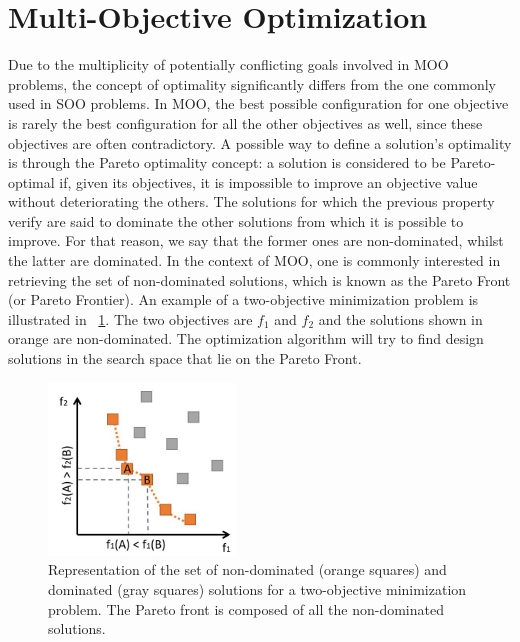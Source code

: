 \section{Multi-Objective Optimization}

Due to the multiplicity of potentially conflicting goals involved in \ac{MOO} problems, the concept of optimality significantly differs from the one commonly used in \ac{SOO} problems. In \ac{MOO}, the best possible configuration for one objective is rarely the best configuration for all the other objectives as well, since these objectives are often contradictory. A possible way to define a solution’s optimality is through the Pareto optimality concept: a solution is considered to be Pareto-optimal if, given its objectives, it is impossible to improve an objective value without deteriorating the others. The solutions for which the previous property verify are said to dominate the other solutions from which it is possible to improve. For that reason, we say that the former ones are non-dominated, whilst the latter are dominated. In the context of \ac{MOO}, one is commonly interested in retrieving the set of non-dominated solutions, which is known as the Pareto Front (or Pareto Frontier). An example of a two-objective minimization problem is illustrated in ~\cref{fig:paretofrontier}. The two objectives are $f_1$ and $f_2$ and the solutions shown in orange are non-dominated. The optimization algorithm will try to find design solutions in the search space that lie on the Pareto Front.


\begin{figure}
\centering
\includegraphics[width=5cm]{Images/Background/pareto-front.JPG}
\caption{Representation of the set of non-dominated (orange squares) and dominated (gray squares) solutions for a two-objective minimization problem. The Pareto front is composed of all the non-dominated solutions.}
\label{fig:paretofrontier}
\end{figure}



